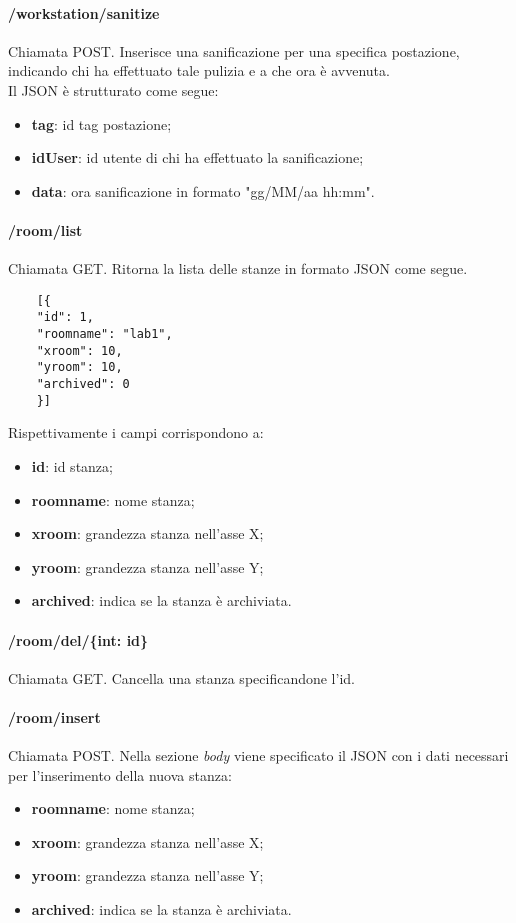 \paragraph{/workstation/sanitize}
Chiamata POST. Inserisce una sanificazione per una specifica postazione, indicando chi ha effettuato tale pulizia e a che ora è avvenuta.\\
Il JSON è strutturato come segue:
\begin{itemize}
	\item \textbf{tag}: id tag postazione;
	\item \textbf{idUser}: id utente di chi ha effettuato la sanificazione;
	\item \textbf{data}: ora sanificazione in formato "gg/MM/aa hh:mm".
\end{itemize}
\paragraph{/room/list}
Chiamata GET. Ritorna la lista delle stanze in formato JSON come segue.	\\
\begin{center}
	\begin{lstlisting}
	[{
	"id": 1,
	"roomname": "lab1",
	"xroom": 10,
	"yroom": 10,
	"archived": 0
	}]
	\end{lstlisting}
\end{center}
Rispettivamente i campi corrispondono a:
\begin{itemize}
	\item \textbf{id}: id stanza;
	\item \textbf{roomname}: nome stanza;
	\item \textbf{xroom}: grandezza stanza nell'asse X;
	\item \textbf{yroom}: grandezza stanza nell'asse Y;
	\item \textbf{archived}: indica se la stanza è archiviata.	
\end{itemize}
\paragraph{/room/del/\{int: id\}}
Chiamata GET. Cancella una stanza specificandone l'id.
\paragraph{/room/insert}
Chiamata POST. Nella sezione \textit{body} viene specificato il JSON con i dati necessari per l'inserimento della nuova stanza:
\begin{itemize}
	\item \textbf{roomname}: nome stanza;
	\item \textbf{xroom}: grandezza stanza nell'asse X;
	\item \textbf{yroom}: grandezza stanza nell'asse Y;
	\item \textbf{archived}: indica se la stanza è archiviata.		
\end{itemize}

